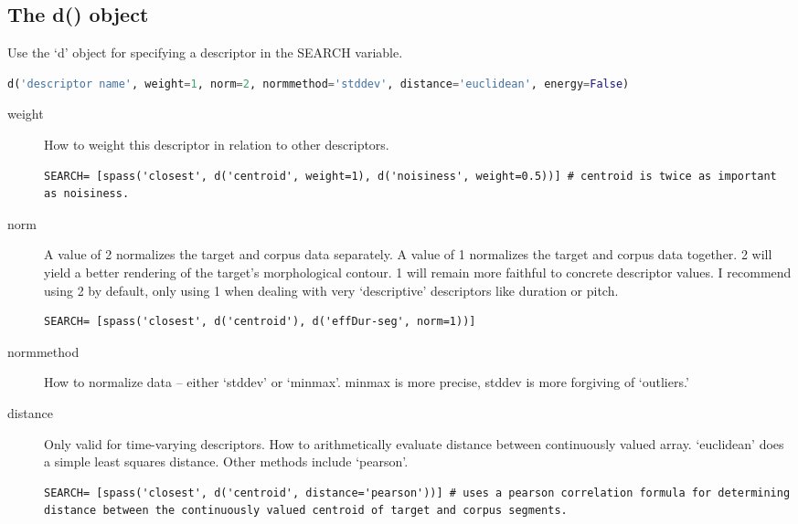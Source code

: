 \documentclass{article}
\begin{document}
\begin{spacing}{1.2}
\section{The d() object}
Use the `d' object for specifying a descriptor in the SEARCH variable.

 \begin{lstlisting}[language=python]
d('descriptor name', weight=1, norm=2, normmethod='stddev', distance='euclidean', energy=False)
\end{lstlisting}
 
\begin{description}

\item[weight] How to weight this descriptor in relation to other descriptors.

\begin{lstlisting}
SEARCH= [spass('closest', d('centroid', weight=1), d('noisiness', weight=0.5))] # centroid is twice as important as noisiness.
\end{lstlisting}

\item[norm] A value of 2 normalizes the target and corpus data separately.  A value of 1 normalizes the target and corpus data together.  2 will yield a better rendering of the target's morphological contour.  1 will remain more faithful to concrete descriptor values.  I recommend using 2 by default, only using 1 when dealing with very `descriptive' descriptors like duration or pitch.

\begin{lstlisting}
SEARCH= [spass('closest', d('centroid'), d('effDur-seg', norm=1))]
\end{lstlisting}

\item[normmethod] How to normalize data -- either `stddev' or `minmax'.  minmax is more precise, stddev is more forgiving of `outliers.'

\item[distance] Only valid for time-varying descriptors.  How to arithmetically evaluate distance between continuously valued array.  `euclidean' does a simple least squares distance.  Other methods include `pearson'.

\begin{lstlisting}
SEARCH= [spass('closest', d('centroid', distance='pearson'))] # uses a pearson correlation formula for determining distance between the continuously valued centroid of target and corpus segments.
\end{lstlisting}


\end{description}
\end{spacing}
\end{document}

